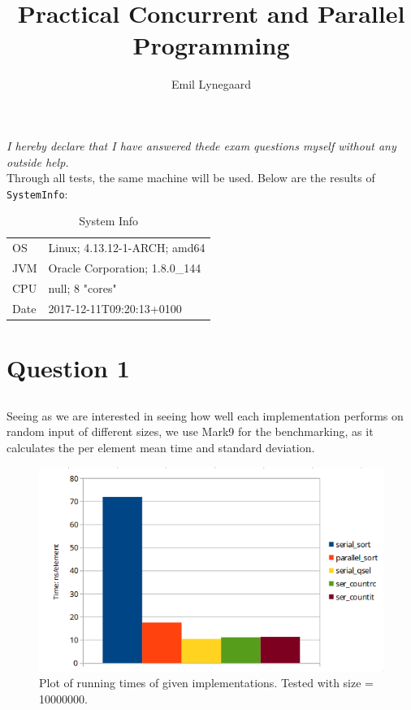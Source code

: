 \documentclass[a5paper]{article}
\title{Practical Concurrent and Parallel Programming}
\author{Emil Lynegaard}
\begin{document}

\maketitle
\textit{I hereby declare that I have answered thede exam questions myself without any outside help.}\\

Through all tests, the same machine will be used. Below are the results of \texttt{SystemInfo}:


\begin{table}[!ht]
\begin{center}
\begin{tabular}{ l l }
OS & Linux; 4.13.12-1-ARCH; amd64\\
JVM & Oracle Corporation; 1.8.0\_144\\
CPU & null; 8 "cores"\\
Date & 2017-12-11T09:20:13+0100
\end{tabular}
\end{center}
\caption{System Info}
\label{sysinfo}
\end{table}

\section{Question 1}
\subsection{}
Seeing as we are interested in seeing how well each implementation performs on random input of different sizes, we use Mark9 for the benchmarking, as it calculates the per element mean time and standard deviation.

\begin{figure}[!ht]
    \centering
    \noindent\includegraphics[scale=0.5]{res/graph_q1.png}
    \caption{Plot of running times of given implementations. Tested with size = 10000000.}
    \label{fig:graphq1}
\end{figure}
\end{document}
